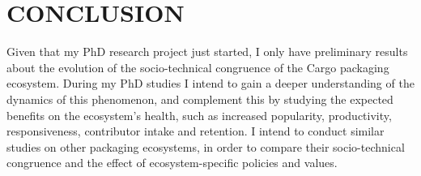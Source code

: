 \section{CONCLUSION}

Given that my PhD research project just started, I only have preliminary results about the evolution of the socio-technical congruence of the Cargo packaging ecosystem.
During my PhD studies I intend to gain a deeper understanding of the dynamics of this phenomenon, and complement this by studying the expected benefits on the ecosystem's health, such as increased popularity, productivity, responsiveness, contributor intake and retention.
I intend to conduct similar studies on other packaging ecosystems, in order to compare their socio-technical congruence and the effect of ecosystem-specific policies and values.
